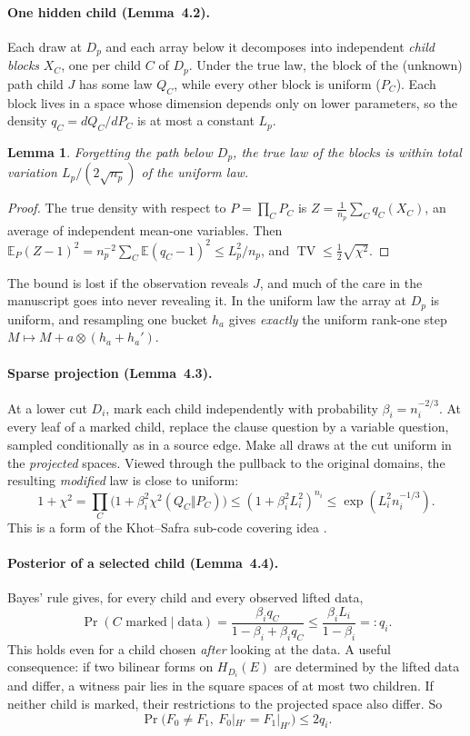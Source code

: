 \documentclass[11pt]{article}
\newtheorem{lemma}[theorem]{Lemma}
\theoremstyle{definition}
\theoremstyle{remark}
\newcommand{\E}{\mathbb E}
\DeclareMathOperator{\TV}{TV}
\begin{document}
\paragraph{One hidden child (Lemma~4.2).} Each draw at $D_p$ and each array
below it decomposes into independent \emph{child blocks} $X_C$, one per child
$C$ of $D_p$. Under the true law, the block of the (unknown) path child $J$ has
some law $Q_C$, while every other block is uniform ($P_C$). Each block lives in
a space whose dimension depends only on lower parameters, so the density
$q_C=dQ_C/dP_C$ is at most a constant $L_p$.

\begin{lemma}\label{lem:hidden-child}
Forgetting the path below $D_p$, the true law of the blocks is within total
variation $L_p/(2\sqrt{n_p})$ of the uniform law.
\end{lemma}

\begin{proof}
The true density with respect to $P=\prod_C P_C$ is
$Z=\frac1{n_p}\sum_C q_C(X_C)$, an average of independent mean-one variables.
Then $\E_P(Z-1)^2=n_p^{-2}\sum_C\E(q_C-1)^2\le L_p^2/n_p$, and
$\TV\le\frac12\sqrt{\chi^2}$.
\end{proof}

The bound is lost if the observation reveals $J$, and much of the care in the
manuscript goes into never revealing it. In the uniform law the array at
$D_p$ is uniform, and resampling one bucket $h_a$ gives \emph{exactly} the
uniform rank-one step $M\mapsto M+a\otimes(h_a+h_a')$.

\paragraph{Sparse projection (Lemma~4.3).} At a lower cut $D_i$, mark each child
independently with probability $\beta_i=n_i^{-2/3}$. At every leaf of a marked
child, replace the clause question by a variable question, sampled
conditionally as in a source edge. Make all draws at the cut uniform in the
\emph{projected} spaces. Viewed through the pullback to the original domains,
the resulting \emph{modified} law is close to uniform:
\[
 1+\chi^2=\prod_C\bigl(1+\beta_i^2\chi^2(Q_C\Vert P_C)\bigr)
 \le(1+\beta_i^2L_i^2)^{n_i}\le\exp(L_i^2n_i^{-1/3}).
\]
This is a form of the Khot--Safra sub-code covering idea \cite{KS}.

\paragraph{Posterior of a selected child (Lemma~4.4).} Bayes' rule gives, for
every child and every observed lifted data,
\[
 \Pr(C\text{ marked}\mid\text{data})
 =\frac{\beta_iq_C}{1-\beta_i+\beta_iq_C}\le\frac{\beta_iL_i}{1-\beta_i}=:q_i.
\]
This holds even for a child chosen \emph{after} looking at the data. A useful
consequence: if two bilinear forms on $H_{D_i}(E)$ are determined by the
lifted data and differ, a witness pair lies in the square spaces of at most
two children. If neither child is marked, their restrictions to the projected
space also differ. So
\[
 \Pr\bigl(F_0\ne F_1,\ F_0|_{H'}=F_1|_{H'}\bigr)\le 2q_i.
\]
\end{document}
